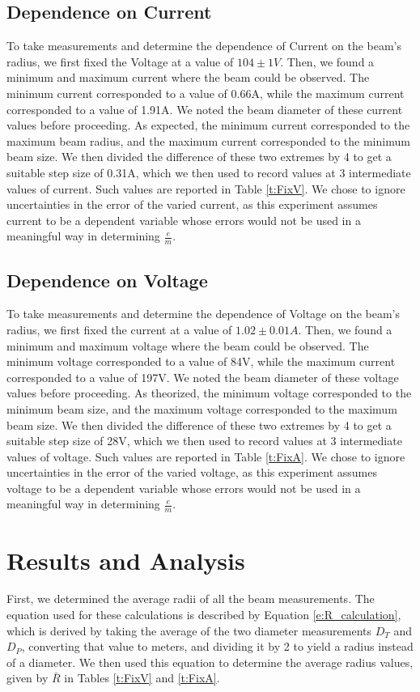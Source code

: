 \documentclass[12pt]{article}
\begin{document}
\subsection{Dependence on Current}
To take measurements and determine the dependence of Current on the beam's radius, we first fixed the Voltage at a value of $104\pm1V$. Then, we found a minimum and maximum current where the beam could be observed. The minimum current corresponded to a value of 0.66A, while the maximum current corresponded to a value of 1.91A. We noted the beam diameter of these current values before proceeding. As expected, the minimum current corresponded to the maximum beam radius, and the maximum current corresponded to the minimum beam size. We then divided the difference of these two extremes by 4 to get a suitable step size of 0.31A, which we then used to record values at 3 intermediate values of current. Such values are reported in Table \ref{t:FixV}. We chose to ignore uncertainties in the error of the varied current, as this experiment assumes current to be a dependent variable whose errors would not be used in a meaningful way in determining $\frac{e}{m}$.

\subsection{Dependence on Voltage}
To take measurements and determine the dependence of Voltage on the beam's radius, we first fixed the current at a value of $1.02\pm0.01A$. Then, we found a minimum and maximum voltage where the beam could be observed. The minimum voltage corresponded to a value of 84V, while the maximum current corresponded to a value of 197V. We noted the beam diameter of these voltage values before proceeding. As theorized, the minimum voltage corresponded to the minimum beam size, and the maximum voltage corresponded to the maximum beam size. We then divided the difference of these two extremes by 4 to get a suitable step size of 28V, which we then used to record values at 3 intermediate values of voltage. Such values are reported in Table \ref{t:FixA}. We chose to ignore uncertainties in the error of the varied voltage, as this experiment assumes voltage to be a dependent variable whose errors would not be used in a meaningful way in determining $\frac{e}{m}$.

\section{Results and Analysis}
First, we determined the average radii of all the beam measurements. The equation used for these calculations is described by Equation \ref{e:R_calculation}, which is derived by taking the average of the two diameter measurements $D_T$ and $D_P$, converting that value to meters, and dividing it by 2 to yield a radius instead of a diameter. We then used this equation to determine the average radius values, given by $\bar{R}$ in Tables \ref{t:FixV} and \ref{t:FixA}.
\end{document}
